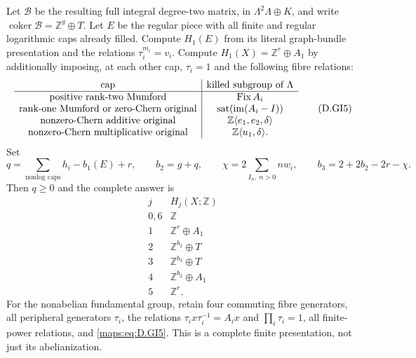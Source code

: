 \begin{theorem}
Let $\mathcal B$ be the resulting full integral degree-two
matrix, in $\Lambda^2\Lambda\oplus K$, and write
$\operatorname{coker}\mathcal B=\mathbb Z^g\oplus T$.
Let $E$ be the regular piece with all finite and regular
logarithmic caps already filled. Compute $H_1(E)$ from its
literal graph-bundle presentation and the relations
$\tau_i^{m_i}=v_i$. Compute $H_1(X)=\mathbb Z^r\oplus A_1$
by additionally imposing, at each other cap, $\tau_i=1$
and the following fibre relations:
\[
\begin{array}{c|c}
\hbox{cap}&\hbox{killed subgroup of }\Lambda\\\hline
\hbox{positive rank-two Mumford}&\operatorname{Fix}A_i\\
\hbox{rank-one Mumford or zero-Chern original}&
                  \operatorname{sat}(\operatorname{im}(A_i-I))\\
\hbox{nonzero-Chern additive original}&
                  \mathbb Z\langle e_1,e_2,\delta\rangle\\
\hbox{nonzero-Chern multiplicative original}&
                  \mathbb Z\langle u_1,\delta\rangle .
\end{array}                                                \tag{D.GI5}\label{maps:eq:D.GI5}
\]
Set
\[
 q=\sum_{\text{nonlog caps}}h_i-b_1(E)+r,\qquad
 b_2=g+q,\qquad
 \chi=2\sum_{I_n,\ n>0}nw_i,\qquad
 b_3=2+2b_2-2r-\chi .                                    \tag{D.GI6}\label{maps:eq:D.GI6}
\]
Then $q\ge0$ and the complete answer is
\[
\begin{array}{c|c}
j&H_j(X;\mathbb Z)\\\hline
0,6&\mathbb Z\\
1&\mathbb Z^r\oplus A_1\\
2&\mathbb Z^{b_2}\oplus T\\
3&\mathbb Z^{b_3}\oplus T\\
4&\mathbb Z^{b_2}\oplus A_1\\
5&\mathbb Z^r .
\end{array}                                                \tag{D.GI7}\label{maps:eq:D.GI7}
\]
For the nonabelian fundamental group, retain four commuting
fibre generators, all peripheral generators $\tau_i$, the
relations $\tau_i x\tau_i^{-1}=A_i x$ and
$\prod_i\tau_i=1$, all finite-power relations, and
\eqref{maps:eq:D.GI5}. This is a complete finite presentation, not just
its abelianization.


\end{theorem}

